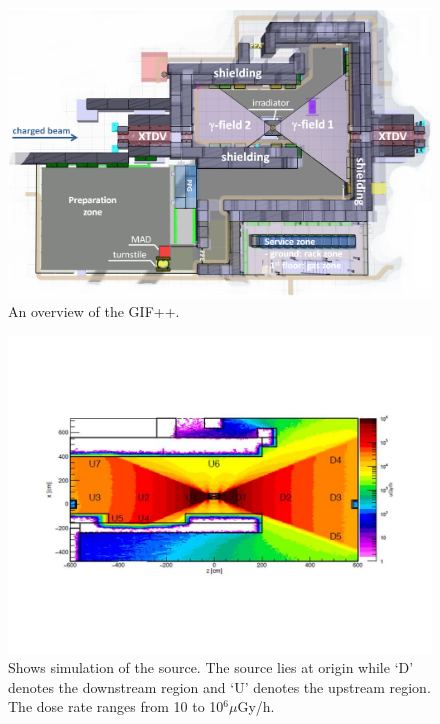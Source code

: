 \documentclass[a4paper,11pt]{article}
\begin{document}
\begin{figure}[htp]
\centering
\hspace{-0.5cm}
\includegraphics[scale=0.35]{images/GIF.png}
 \caption{An overview of the GIF++.}
\label{gif}
\end{figure}

\begin{figure}[htp]
\centering
\hspace{-0.5cm}
\includegraphics[scale=0.5,trim=60 130 60 130,clip]{images/simulation.jpg}
 \caption{Shows simulation of the source. The source lies at origin while `D' denotes the downstream region and `U' denotes the upstream region. The dose rate ranges from 10 to 10$^{6} \mu$Gy/h. }
\label{source}
\end{figure}
\end{document}
